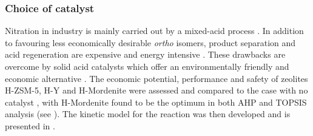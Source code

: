 \subsubsection{Choice of catalyst}
Nitration in industry is mainly carried out by a mixed-acid process \cite{halder_nitration_2007}.
In addition to favouring less economically desirable \textit{ortho} isomers, product separation and acid regeneration are expensive and energy intensive \cite{sreedhar_scientific_2013}.
These drawbacks are overcome by solid acid catalysts which offer an environmentally friendly and economic alternative \cite{vassena_selective_1999}.
The economic potential, performance and safety of zeolites H-ZSM-5, H-Y and H-Mordenite were assessed and compared to the case with no catalyst \cite{jeeru_kinetics_2018}, with H-Mordenite found to be the optimum in both AHP and TOPSIS analysis (see ).
The kinetic model for the reaction was then developed and is presented in .

\begin{comment}
Nitration in industry is mainly carried out by a mixed-acid process, whereby sulfuric acid donates a proton to nitric acid, yielding a nitronium ion which will then react with toluene []. In addition to favouring less economically desirable \textit{ortho} isomers, product separation from the acid and acid regeneration are expensive and energy intensive \cite{sreedhar_scientific_2013}. These drawbacks can be overcome by using solid acid catalysts which offer an environmentally friendly and economic alternative to sulfuric acid \cite{vassena_selective_1999}. Based on those arguments, Nitroma will develop a safer and low environmental impact process employing zeolite catalysts for toluene nitration. More specifically, the relative benefits and disadvantages of 3 different zeolites were evaluated with the AHP and TOPSIS decision analysis methods to select the optimum catalyst. The economic potential, performance and safety of zeolites H-ZSM-5, H-Y and H-Mordenite were assessed and compared to the case with no catalyst \cite{jeeru_kinetics_2018}. The economic potential was measured with the cost of the catalyst and the percentage of undesirable by-product formed. Conversion and the NFPA score are the KPIs for performance and safety respectively. H-Mordenite was found optimum for the catalytic nitration of toluene by both AHP and TOPSIS analysis (\Cref{app:matrix}). The kinetic model for the reaction was then developed and is presented in \Cref{app:kinetics}.
\end{comment}

